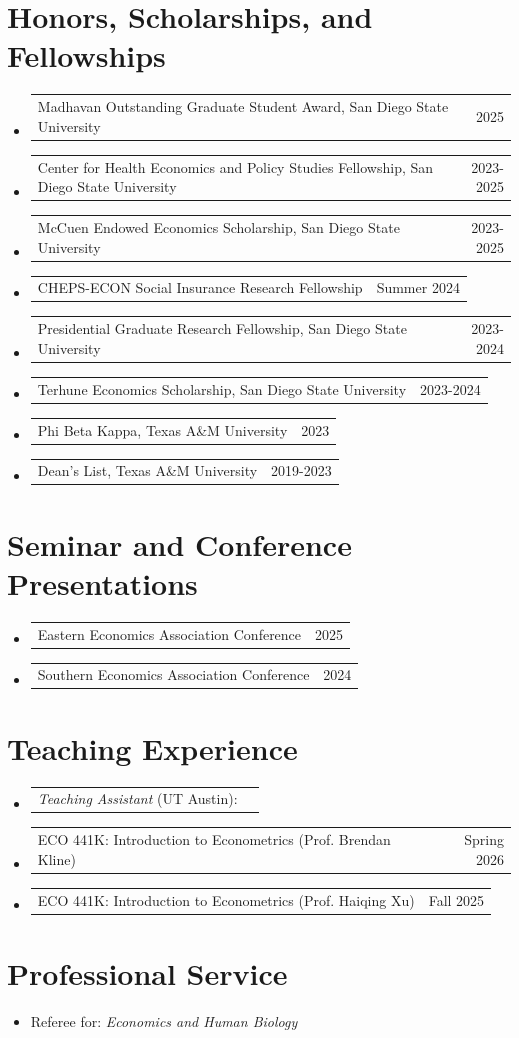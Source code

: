 \documentclass[letterpaper,11pt]{article}
\makeatletter
\newcommand{\resumeSubSubheading}[2]{
    \item
    \begin{tabular*}{0.97\textwidth}{l@{\extracolsep{\fill}}r}
      #1 & #2 \\
    \end{tabular*}\vspace{-7pt}
}
\newcommand{\resumeSubHeadingListStart}{\begin{itemize}[leftmargin=0.15in, label={}]}
\newcommand{\resumeSubHeadingListEnd}{\end{itemize}}
\makeatother
\begin{document}
\section{Honors, Scholarships, and Fellowships}
    \resumeSubHeadingListStart
      \resumeSubSubheading{Madhavan 
      Outstanding Graduate Student Award, 
      San Diego State University}{2025}

      \resumeSubSubheading{Center for Health
      Economics and Policy Studies Fellowship, San Diego 
      State University}{2023-2025}

      \resumeSubSubheading{McCuen Endowed Economics Scholarship,
      San Diego State University}{2023-2025}

      \resumeSubSubheading{CHEPS-ECON Social Insurance 
      Research Fellowship}{Summer 2024}

      \resumeSubSubheading{Presidential Graduate Research 
      Fellowship, San Diego State University}{2023-2024}

      \resumeSubSubheading{Terhune Economics Scholarship,
      San Diego State University}{2023-2024}

      \resumeSubSubheading{Phi Beta Kappa, Texas A\&M University}{2023}

      \resumeSubSubheading{Dean's List, Texas A\&M University}{2019-2023}
    \resumeSubHeadingListEnd

\section{Seminar and Conference Presentations}

    \resumeSubHeadingListStart
      \resumeSubSubheading{Eastern Economics Association Conference}{2025}

      \resumeSubSubheading{Southern Economics Association Conference}{2024}
    \resumeSubHeadingListEnd

\section{Teaching Experience}
  \resumeSubHeadingListStart
    \resumeSubSubheading{\emph{Teaching Assistant} (UT Austin):}{}
      \resumeSubSubheading{ECO 441K: Introduction to Econometrics (Prof. Brendan Kline)}{Spring 2026}
      \resumeSubSubheading{ECO 441K: Introduction to Econometrics (Prof. Haiqing Xu)}{Fall 2025}
  \resumeSubHeadingListEnd

\section{Professional Service}
    \resumeSubHeadingListStart
    \item 
    Referee for: \emph{Economics and Human Biology}
    \resumeSubHeadingListEnd
\end{document}
